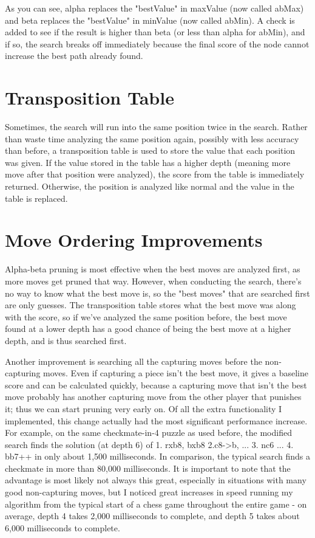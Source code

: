 \documentclass[10pt]{article}
\begin{document}
As you can see, alpha replaces the "bestValue" in maxValue (now called abMax) and beta replaces the "bestValue" in minValue (now called abMin). A check is added to see if the result is higher than beta (or less than alpha for abMin), and if so, the search breaks off immediately because the final score of the node cannot increase the best path already found.

\section{Transposition Table}

Sometimes, the search will run into the same position twice in the search. Rather than waste time analyzing the same position again, possibly with less accuracy than before, a transposition table is used to store the value that each position was given. If the value stored in the table has a higher depth (meaning more move after that position were analyzed), the score from the table is immediately returned. Otherwise, the position is analyzed like normal and the value in the table is replaced.

\section{Move Ordering Improvements}

Alpha-beta pruning is most effective when the best moves are analyzed first, as more moves get pruned that way. However, when conducting the search, there's no way to know what the best move is, so the "best moves" that are searched first are only guesses. The transposition table stores what the best move was along with the score, so if we've analyzed the same position before, the best move found at a lower depth has a good chance of being the best move at a higher depth, and is thus searched first. 

Another improvement is searching all the capturing moves before the non-capturing moves. Even if capturing a piece isn't the best move, it gives a baseline score and can be calculated quickly, because a capturing move that isn't the best move probably has another capturing move from the other player that punishes it; thus we can start pruning very early on. Of all the extra functionality I implemented, this change actually had the most significant performance increase. For example, on the same checkmate-in-4 puzzle as used before, the modified search finds the solution (at depth 6) of 1. rxb8, bxb8 2.c8->b, ... 3. nc6 ... 4. bb7++ in only about 1,500 milliseconds. In comparison, the typical search finds a checkmate in more than 80,000 milliseconds. It is important to note that the advantage is most likely not always this great, especially in situations with many good non-capturing moves, but I noticed great increases in speed running my algorithm from the typical start of a chess game throughout the entire game - on average, depth 4 takes 2,000 milliseconds to complete, and depth 5 takes about 6,000 milliseconds to complete.
\end{document}
